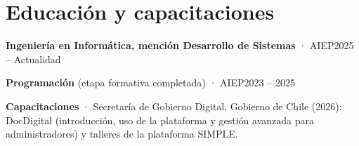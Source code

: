 \documentclass[10pt,a4paper]{article}
\begin{document}
\section{Educación y capacitaciones}
\textbf{Ingeniería en Informática, mención Desarrollo de Sistemas} · AIEP\hfill 2025 -- Actualidad\par
\textbf{Programación} (etapa formativa completada) · AIEP\hfill 2023 -- 2025\par

\textbf{Capacitaciones} · Secretaría de Gobierno Digital, Gobierno de Chile (2026): DocDigital (introducción, uso de la plataforma
y gestión avanzada para administradores) y talleres de la plataforma SIMPLE.\par
\end{document}
